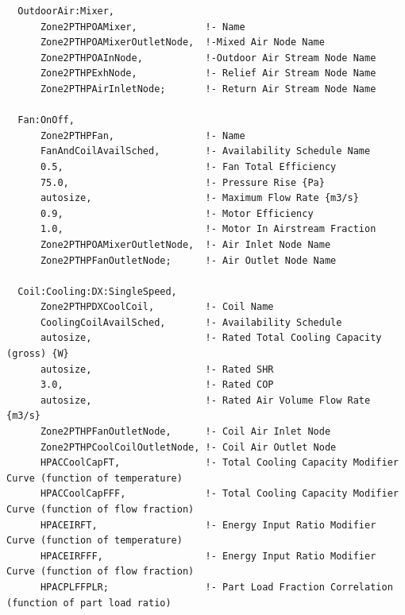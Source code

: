 \begin{lstlisting}
  OutdoorAir:Mixer,
      Zone2PTHPOAMixer,            !- Name
      Zone2PTHPOAMixerOutletNode,  !-Mixed Air Node Name
      Zone2PTHPOAInNode,           !-Outdoor Air Stream Node Name
      Zone2PTHPExhNode,            !- Relief Air Stream Node Name
      Zone2PTHPAirInletNode;       !- Return Air Stream Node Name

  Fan:OnOff,
      Zone2PTHPFan,                !- Name
      FanAndCoilAvailSched,        !- Availability Schedule Name
      0.5,                         !- Fan Total Efficiency
      75.0,                        !- Pressure Rise {Pa}
      autosize,                    !- Maximum Flow Rate {m3/s}
      0.9,                         !- Motor Efficiency
      1.0,                         !- Motor In Airstream Fraction
      Zone2PTHPOAMixerOutletNode,  !- Air Inlet Node Name
      Zone2PTHPFanOutletNode;      !- Air Outlet Node Name

  Coil:Cooling:DX:SingleSpeed,
      Zone2PTHPDXCoolCoil,         !- Coil Name
      CoolingCoilAvailSched,       !- Availability Schedule
      autosize,                    !- Rated Total Cooling Capacity (gross) {W}
      autosize,                    !- Rated SHR
      3.0,                         !- Rated COP
      autosize,                    !- Rated Air Volume Flow Rate {m3/s}
      Zone2PTHPFanOutletNode,      !- Coil Air Inlet Node
      Zone2PTHPCoolCoilOutletNode, !- Coil Air Outlet Node
      HPACCoolCapFT,               !- Total Cooling Capacity Modifier Curve (function of temperature)
      HPACCoolCapFFF,              !- Total Cooling Capacity Modifier Curve (function of flow fraction)
      HPACEIRFT,                   !- Energy Input Ratio Modifier Curve (function of temperature)
      HPACEIRFFF,                  !- Energy Input Ratio Modifier Curve (function of flow fraction)
      HPACPLFFPLR;                 !- Part Load Fraction Correlation (function of part load ratio)


\end{lstlisting}
